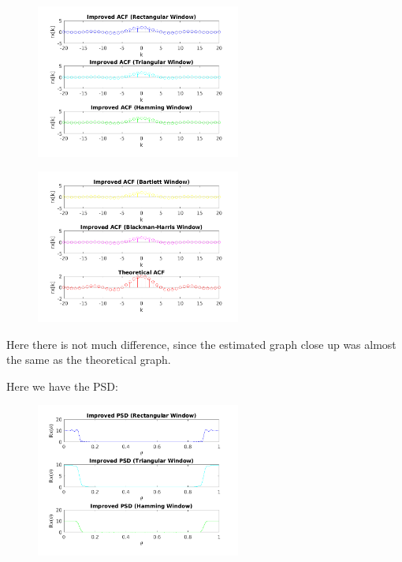 \documentclass[a4paper,11pt]{article}
\begin{document}
\begin{figure}[!hp]
    \begin{center}
      \includegraphics[width=0.6\textwidth]{images/study2/acf_hd_stem1.png}
    \end{center}
\end{figure}

\begin{figure}[!hp]
    \begin{center}
      \includegraphics[width=0.6\textwidth]{images/study2/acf_hd_stem2.png}
    \end{center}
\end{figure}

Here there is not much difference, since the estimated graph close up was
almost the same as the theoretical graph.

\newpage

Here we have the PSD:

\begin{figure}[!hp]
    \begin{center}
      \includegraphics[width=0.6\textwidth]{images/study2/psd_hd_window1.png}
    \end{center}
\end{figure}
\end{document}
